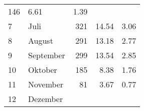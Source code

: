 \begin{longtable}{lXrrr}
       \num{146} &
       \num[round-mode=places,round-precision=2]{6.61} &
         \num[round-mode=places,round-precision=2]{1.39} \\

     7 &
     \multicolumn{1}{X}{ Juli   } &


       \num{321} &
       \num[round-mode=places,round-precision=2]{14.54} &
         \num[round-mode=places,round-precision=2]{3.06} \\

     8 &
     \multicolumn{1}{X}{ August   } &


       \num{291} &
       \num[round-mode=places,round-precision=2]{13.18} &
         \num[round-mode=places,round-precision=2]{2.77} \\

     9 &
     \multicolumn{1}{X}{ September   } &


       \num{299} &
       \num[round-mode=places,round-precision=2]{13.54} &
         \num[round-mode=places,round-precision=2]{2.85} \\

     10 &
     \multicolumn{1}{X}{ Oktober   } &


       \num{185} &
       \num[round-mode=places,round-precision=2]{8.38} &
         \num[round-mode=places,round-precision=2]{1.76} \\

     11 &
     \multicolumn{1}{X}{ November   } &


       \num{81} &
       \num[round-mode=places,round-precision=2]{3.67} &
         \num[round-mode=places,round-precision=2]{0.77} \\

     12 &
     \multicolumn{1}{X}{ Dezember   } &



\end{longtable}
